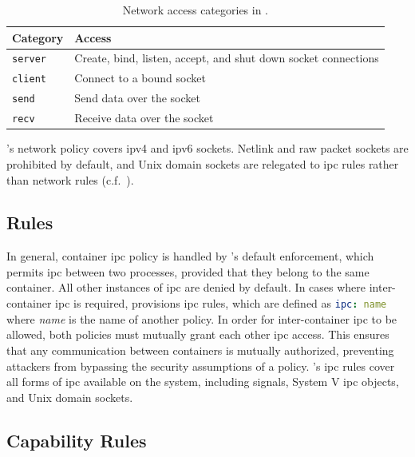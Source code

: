 \begin{table}[htpb]
  \centering
  \caption[Network access categories in \bpfcontain{}]{
    Network access categories in \bpfcontain{}.
  }%
  \label{tab:bpfcontain-network}
  \begin{tabular}{ll}
  \toprule
  Category & Access \\
  \midrule
  \texttt{server} & Create, bind, listen, accept, and shut down socket connections \\
  \texttt{client} & Connect to a bound socket \\
  \texttt{send} & Send data over the socket \\
  \texttt{recv} & Receive data over the socket \\
  \bottomrule
  \end{tabular}
\end{table}

\bpfcontain{}'s network policy covers \gls{ip}v4 and \gls{ip}v6 sockets. Netlink and raw
packet sockets are prohibited by default, and Unix domain sockets are relegated to
\gls{ipc} rules rather than network rules (c.f.~).

\subsection{ Rules}%
\label{ss:bpfcontain-ipc}

In general, container \gls{ipc} policy is handled by \bpfcontain{}'s default enforcement,
which permits \gls{ipc} between two processes, provided that they belong to the same
container. All other instances of \gls{ipc} are denied by default. In cases where
inter-container \gls{ipc} is required, \bpfcontain{} provisions \gls{ipc} rules, which are
defined as \lstinline[language=yaml]|ipc: name| where \textit{name} is the name of another
\bpfcontain{} policy. In order for inter-container \gls{ipc} to be allowed, both policies
must mutually grant each other \gls{ipc} access. This ensures that any communication
between containers is mutually authorized, preventing attackers from bypassing the
security assumptions of a policy. \bpfcontain{}'s \gls{ipc} rules cover all forms of
\gls{ipc} available on the system, including signals, System V \gls{ipc} objects, and Unix
domain sockets.

\subsection{Capability Rules}

